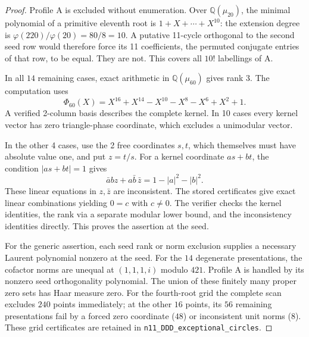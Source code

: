 \documentclass[11pt,a4paper]{article}
\theoremstyle{plain}
\theoremstyle{definition}
\theoremstyle{plain}
\begin{document}
\begin{proof}
Profile $\mathrm{A}$ is excluded without enumeration. Over $\mathbb Q(\mu_{20})$, the minimal polynomial of a primitive eleventh root is $1+X+\cdots+X^{10}$: the extension degree is $\varphi(220)/\varphi(20)=80/8=10$. A putative 11-cycle orthogonal to the second seed row would therefore force its 11 coefficients, the permuted conjugate entries of that row, to be equal. They are not. This covers all $10!$ labellings of $\mathrm{A}$.

\medskip
In all $14$ remaining cases, exact arithmetic in $\mathbb Q(\mu_{60})$ gives rank 3. The computation uses
$$\Phi_{60}(X)=X^{16}+X^{14}-X^{10}-X^8-X^6+X^2+1.$$
A verified 2-column basis describes the complete kernel. In 10 cases every kernel vector has zero triangle-phase coordinate, which excludes a unimodular vector.

In the other 4 cases, use the 2 free coordinates $s,t$, which themselves must have absolute value one, and put $z=t/s$. For a kernel coordinate $as+bt$, the condition $|as+bt|=1$ gives
$$\bar abz+a\bar b\,\bar z=1-|a|^2-|b|^2.$$
These linear equations in $z,\bar z$ are inconsistent. The stored certificates give exact linear combinations yielding $0=c$ with $c\ne0$. The verifier checks the kernel identities, the rank via a separate modular lower bound, and the inconsistency identities directly. This proves the assertion at the seed.

For the generic assertion, each seed rank or norm exclusion supplies a necessary Laurent polynomial nonzero at the seed. For the $14$ degenerate presentations, the cofactor norms are unequal at $(1,1,1,i)$ modulo $421$. Profile $\mathrm{A}$ is handled by its nonzero seed orthogonality polynomial. The union of these finitely many proper zero sets has Haar measure zero. For the fourth-root grid the complete scan excludes $240$ points immediately; at the other $16$ points, its $56$ remaining presentations fail by a forced zero coordinate ($48$) or inconsistent unit norms ($8$). These grid certificates are retained in \texttt{n11\_DDD\_exceptional\_circles}.
\end{proof}
\end{document}
